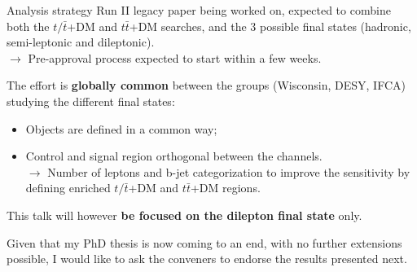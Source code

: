 \documentclass[8pt]{beamer}
\begin{document}
\begin{frame}{Analysis strategy}
\justifying
Run II legacy paper being worked on, expected to \alert{combine both the $t/\bar t$+DM and $t \bar t$+DM searches}, and the 3 possible final states (hadronic, semi-leptonic and dileptonic). \\
\hspace{10pt} $\rightarrow$ Pre-approval process expected to start within a few weeks. \vfill

The effort is \textbf{globally common} between the groups (Wisconsin, DESY, IFCA) studying the different final states:
\begin{itemize}
\justifying
\item Objects are defined in a common way;
\item Control and signal region orthogonal between the channels.\\
$\rightarrow$ Number of leptons and b-jet categorization to improve the sensitivity by defining enriched $t/\bar t$+DM and $t \bar t$+DM regions.
\end{itemize} \vfill

This talk will however \textbf{be focused on the dilepton final state} only. \vfill
\begin{block}{}
\begin{center}
Given that my PhD thesis is now coming to an end, with no further extensions possible, I would like to ask the conveners to endorse the results presented next.
\end{center}
\end{block} \vfill
\end{frame}
\end{document}
